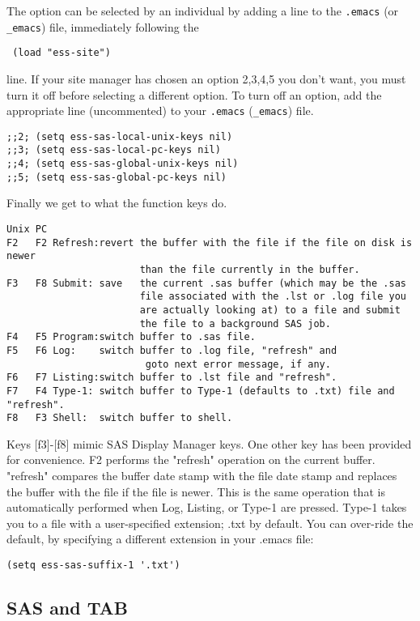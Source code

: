 \documentclass{article}
\begin{document}
The option can be selected by an individual by adding a line to the
\verb+.emacs+ (or \verb+_emacs+) file, immediately following the
\begin{verbatim}
 (load "ess-site")
\end{verbatim}
line.  If your site manager has chosen an option 2,3,4,5 you don't
want, you must turn it off before selecting a different option.  To
turn off an option, add the appropriate line (uncommented) to your
\verb+.emacs+ (\verb+_emacs+) file.
\begin{verbatim}
;;2; (setq ess-sas-local-unix-keys nil)
;;3; (setq ess-sas-local-pc-keys nil)
;;4; (setq ess-sas-global-unix-keys nil)
;;5; (setq ess-sas-global-pc-keys nil)
\end{verbatim}
Finally we get to what the function keys do.
\begin{verbatim}
Unix PC
F2   F2 Refresh:revert the buffer with the file if the file on disk is newer
                       than the file currently in the buffer.
F3   F8 Submit: save   the current .sas buffer (which may be the .sas
                       file associated with the .lst or .log file you
                       are actually looking at) to a file and submit
                       the file to a background SAS job.
F4   F5 Program:switch buffer to .sas file.
F5   F6 Log:    switch buffer to .log file, "refresh" and 
                        goto next error message, if any.
F6   F7 Listing:switch buffer to .lst file and "refresh".
F7   F4 Type-1: switch buffer to Type-1 (defaults to .txt) file and "refresh".
F8   F3 Shell:  switch buffer to shell.
\end{verbatim}

Keys [f3]-[f8] mimic SAS Display Manager keys.  One other key has been
provided for convenience.  F2 performs the "refresh" operation on the
current buffer.  "refresh" compares the buffer date stamp with the
file date stamp and replaces the buffer with the file if the file is
newer.  This is the same operation that is automatically performed
when Log, Listing, or Type-1 are pressed.  Type-1 takes you to a file
with a user-specified extension; .txt by default.  You can over-ride
the default, by specifying a different extension in your .emacs file:
\begin{verbatim}
(setq ess-sas-suffix-1 '.txt')
\end{verbatim}

\subsection{SAS and TAB}
\label{sec:SAS:tab}
\end{document}
